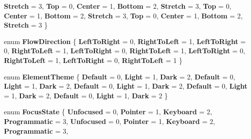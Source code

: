 \begin{DoxyCompactItemize}
{\bfseries Stretch} = 3, 
\newline
{\bfseries Top} = 0, 
{\bfseries Center} = 1, 
{\bfseries Bottom} = 2, 
{\bfseries Stretch} = 3, 
\newline
{\bfseries Top} = 0, 
{\bfseries Center} = 1, 
{\bfseries Bottom} = 2, 
{\bfseries Stretch} = 3, 
\newline
{\bfseries Top} = 0, 
{\bfseries Center} = 1, 
{\bfseries Bottom} = 2, 
{\bfseries Stretch} = 3
 \}
\item 
\mbox{\label{namespace_windows_1_1_u_i_1_1_xaml_a05520a61af727955c4e50fc1f58fb7db}} 
enum {\bfseries Flow\+Direction} \{ \newline
{\bfseries Left\+To\+Right} = 0, 
{\bfseries Right\+To\+Left} = 1, 
{\bfseries Left\+To\+Right} = 0, 
{\bfseries Right\+To\+Left} = 1, 
\newline
{\bfseries Left\+To\+Right} = 0, 
{\bfseries Right\+To\+Left} = 1, 
{\bfseries Left\+To\+Right} = 0, 
{\bfseries Right\+To\+Left} = 1, 
\newline
{\bfseries Left\+To\+Right} = 0, 
{\bfseries Right\+To\+Left} = 1
 \}
\item 
\mbox{\label{namespace_windows_1_1_u_i_1_1_xaml_a7e1a4f3aaa641c44365e5b007c4d84ce}} 
enum {\bfseries Element\+Theme} \{ \newline
{\bfseries Default} = 0, 
{\bfseries Light} = 1, 
{\bfseries Dark} = 2, 
{\bfseries Default} = 0, 
\newline
{\bfseries Light} = 1, 
{\bfseries Dark} = 2, 
{\bfseries Default} = 0, 
{\bfseries Light} = 1, 
\newline
{\bfseries Dark} = 2, 
{\bfseries Default} = 0, 
{\bfseries Light} = 1, 
{\bfseries Dark} = 2, 
\newline
{\bfseries Default} = 0, 
{\bfseries Light} = 1, 
{\bfseries Dark} = 2
 \}
\item 
\mbox{\label{namespace_windows_1_1_u_i_1_1_xaml_a1ea241d4a0cb7c10af82c7b36d2806bc}} 
enum {\bfseries Focus\+State} \{ \newline
{\bfseries Unfocused} = 0, 
{\bfseries Pointer} = 1, 
{\bfseries Keyboard} = 2, 
{\bfseries Programmatic} = 3, 
\newline
{\bfseries Unfocused} = 0, 
{\bfseries Pointer} = 1, 
{\bfseries Keyboard} = 2, 
{\bfseries Programmatic} = 3, 
\newline

\end{DoxyCompactItemize}
